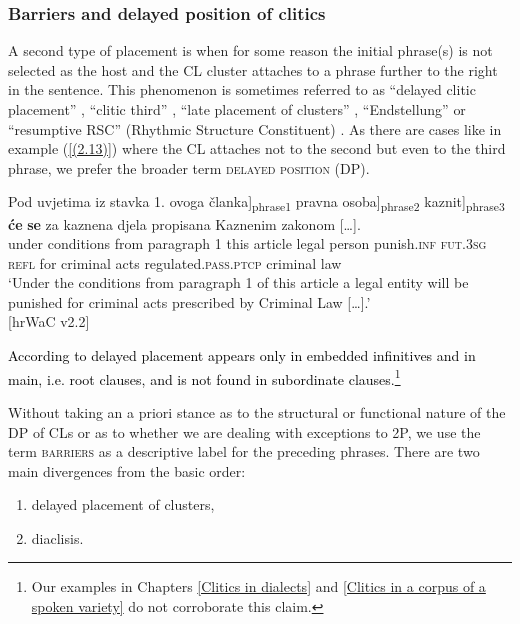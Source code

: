 \subsubsection{Barriers and delayed position of clitics}
\label{Barriers and delayed placement of clitics (DP)}
A second type of placement is when for some reason the initial phrase(s) is not selected as the host and the CL cluster attaches to a phrase further to the right in the sentence. This phenomenon is sometimes referred to as ``delayed clitic placement'' \citep{InkelasZec90}, ``clitic third'' \citep{CavarWilder94, Schutze94}, ``late placement of clusters'' \citep{ZimmerlingKosta13}, ``Endstellung'' \citep{Reinkowski01} or ``resumptive RSC'' (Rhythmic Structure Constituent) \citep{Alexander08, Alexander09}. As there are cases like in example (\ref{(2.13)}) where the CL attaches not to the second but even to the third phrase, we prefer the broader term \textsc{delayed position} (DP). 

\begin{exe}\ex\label{(2.13)}
\gll \minsp{[} Pod uvjetima iz stavka 1. ovoga članka]\textsubscript{phrase1} \minsp{[} pravna osoba]\textsubscript{phrase2} \minsp{[} kaznit]\textsubscript{phrase3} \textbf{će} \textbf{se} za kaznena djela propisana Kaznenim {zakonom [\dots].} \\
{} under conditions from paragraph 1 this article {} legal person {} punish\textsc{.inf} \textsc{fut.3sg} \textsc{refl} for criminal acts regulated\textsc{.pass.ptcp} criminal law  \\
\glt ‘Under the conditions from paragraph 1 of this article a legal entity will be punished for criminal acts prescribed by Criminal Law [\dots].’  \\
\hfill [hrWaC v2.2]
\end{exe}\clearpage


\noindent \textcolor{black}{According to \citet[439]{CavarWilder94} delayed placement appears only in embedded infinitives and in main, i.e. root clauses, and is not found in subordinate clauses.\footnote{Our examples in Chapters \ref{Clitics in dialects} and \ref{Clitics in a corpus of a spoken variety} do not corroborate this claim.}}

Without taking an a priori stance as to the structural or functional nature of the DP of CLs or as to whether we are dealing with exceptions to 2P, we use the term \textsc{barriers} as a descriptive label for the preceding phrases. There are two main divergences from the basic order:
\begin{enumerate}	
 \item delayed placement of clusters, 
 \item diaclisis. 
\end{enumerate}

